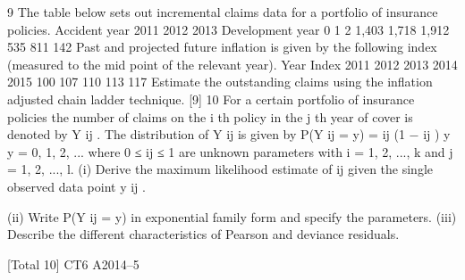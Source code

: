 \documentclass[a4paper,12pt]{article}
\begin{document}
\begin{enumerate}
[Total 9]9
The table below sets out incremental claims data for a portfolio of insurance policies.
Accident year
2011
2012
2013
Development year
0
1
2
1,403
1,718
1,912
535
811
142
Past and projected future inflation is given by the following index (measured to the
mid point of the relevant year).
Year Index
2011
2012
2013
2014
2015 100
107
110
113
117
Estimate the outstanding claims using the inflation adjusted chain ladder technique.
[9]
10
For a certain portfolio of insurance policies the number of claims on the i th policy in
the j th year of cover is denoted by Y ij . The distribution of Y ij is given by
P(Y ij = y) = \theta ij (1 − \theta ij ) y
y = 0, 1, 2, ...
where 0 ≤ \theta ij ≤ 1 are unknown parameters with i = 1, 2, ..., k and j = 1, 2, ..., l.
(i) Derive the maximum likelihood estimate of \theta ij given the single observed data
point y ij .

(ii) Write P(Y ij = y) in exponential family form and specify the parameters.
(iii) Describe the different characteristics of Pearson and deviance residuals.

[Total 10]
CT6 A2014–5















\end{enumerate}
\end{document}
